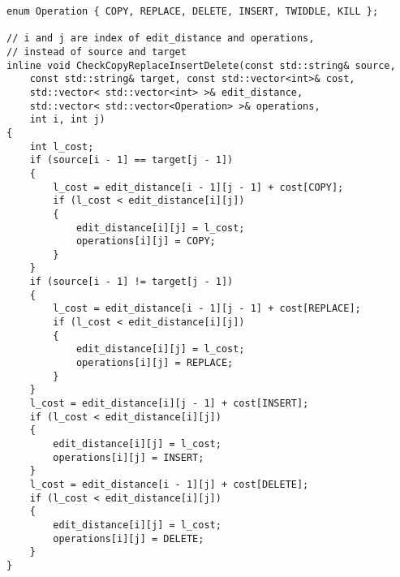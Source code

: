 \begin{verbatim}
enum Operation { COPY, REPLACE, DELETE, INSERT, TWIDDLE, KILL };

// i and j are index of edit_distance and operations,
// instead of source and target
inline void CheckCopyReplaceInsertDelete(const std::string& source,
    const std::string& target, const std::vector<int>& cost,
    std::vector< std::vector<int> >& edit_distance,
    std::vector< std::vector<Operation> >& operations,
    int i, int j)
{
    int l_cost;
    if (source[i - 1] == target[j - 1])
    {
        l_cost = edit_distance[i - 1][j - 1] + cost[COPY];
        if (l_cost < edit_distance[i][j])
        {
            edit_distance[i][j] = l_cost;
            operations[i][j] = COPY;
        }
    }
    if (source[i - 1] != target[j - 1])
    {
        l_cost = edit_distance[i - 1][j - 1] + cost[REPLACE];
        if (l_cost < edit_distance[i][j])
        {
            edit_distance[i][j] = l_cost;
            operations[i][j] = REPLACE;
        }
    }
    l_cost = edit_distance[i][j - 1] + cost[INSERT];
    if (l_cost < edit_distance[i][j])
    {
        edit_distance[i][j] = l_cost;
        operations[i][j] = INSERT;
    }
    l_cost = edit_distance[i - 1][j] + cost[DELETE];
    if (l_cost < edit_distance[i][j])
    {
        edit_distance[i][j] = l_cost;
        operations[i][j] = DELETE;
    }
}


\end{verbatim}
